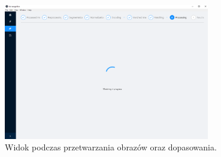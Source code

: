 \begin{figure}[ht]
  \centering
  \includegraphics[width=0.8\textwidth]{images/app/matchingProgress.png}
  \caption{Widok podczas przetwarzania obrazów oraz dopasowania.}
  \label{fig:matchingProcessing}
\end{figure}

